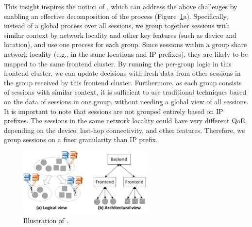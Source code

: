 This insight inspires the notion  of {\em \idea}, which can 
 address the above challenges by enabling an effective decomposition 
 of the \mab process (Figure~\ref{fig:system-overview}a).  
 Specifically, instead of a global \mab
process over all sessions, we group together sessions with similar context by 
network locality and other key features (such as device and location), and
use one \mab process for each group.
Since sessions within a group share network locality (e.g., 
in the same locations and IP prefixes), 
they are likely to be mapped to the same frontend cluster.
By running the per-group \mab logic in this frontend cluster, we can update
decisions with fresh data from other sessions in the group received by this frontend cluster.
 Furthermore, as each group consists of sessions with similar context, 
it is sufficient to use traditional \mab techniques based on the data of sessions
in one group, 
without needing a global view of all sessions.
It is important to note that sessions are not grouped entirely based on IP prefixes. The sessions in the same network locality could have very different QoE, depending on the device, last-hop connectivity, and other features. Therefore, we group sessions on a finer granularity than IP prefix.

\begin{figure}[t!]
\centering
\includegraphics[width=0.6\textwidth]{figures/pytheas-system-overview-group.pdf}
\caption{Illustration of \idea.}
\label{fig:system-overview}
\end{figure}



